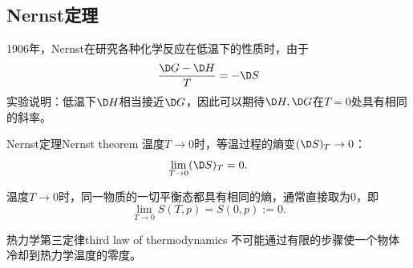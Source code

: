 \subsection{Nernst定理}

1906年，Nernst在研究各种化学反应在低温下的性质时，由于
\[
	\frac{\D G-\D H}T=-\D S
\]
实验说明：低温下$\D H$相当接近$\D G$，因此可以期待$\D H,\D G$在$T=0$处具有相同的斜率。

\begin{theorem}
	{Nernst定理}{Nernst theorem}
	温度$T\to 0$时，等温过程的熵变$(\D S)_T\to 0$：
	\begin{equation}
		\lim_{T\to 0}(\D S)_T=0.
	\end{equation}
\end{theorem}

\begin{corollary}
	温度$T\to 0$时，同一物质的一切平衡态都具有相同的熵，通常直接取为0，即
	\begin{equation}
		\lim_{T\to 0}S(T,p)=S(0,p):=0.
	\end{equation}
\end{corollary}

\begin{theorem}
	{热力学第三定律}{third law of thermodynamics}
	不可能通过有限的步骤使一个物体冷却到热力学温度的零度。
\end{theorem}

